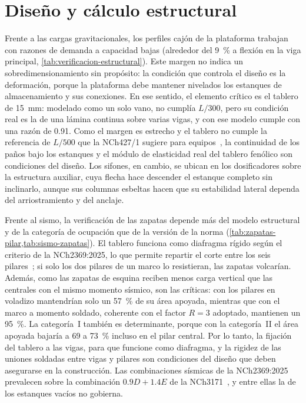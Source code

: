 \section{Diseño y cálculo estructural}
\label{sec:dis-estructural}

Frente a las cargas gravitacionales, los perfiles cajón de la plataforma trabajan con razones de demanda a capacidad bajas (alrededor del \qty{9}{\percent} a flexión en la viga principal, \cref{tab:verificacion-estructural}).
Este margen no indica un sobredimensionamiento sin propósito: la condición que controla el diseño es la deformación, porque la plataforma debe mantener nivelados los estanques de almacenamiento y sus conexiones.
En ese sentido, el elemento crítico es el tablero de \qty{15}{\milli\meter}: modelado como un solo vano, no cumplía $L/300$, pero su condición real es la de una lámina continua sobre varias vigas, y con ese modelo cumple con una razón de \num{0.91}.
Como el margen es estrecho y el tablero no cumple la referencia de $L/500$ que la NCh427/1 sugiere para equipos~\parencite{inn2016nch427}, la continuidad de los paños bajo los estanques y el módulo de elasticidad real del tablero fenólico son condiciones del diseño.
Los sifones, en cambio, se ubican en los dosificadores sobre la estructura auxiliar, cuya flecha hace descender el estanque completo sin inclinarlo, aunque sus columnas esbeltas hacen que su estabilidad lateral dependa del arriostramiento y del anclaje.

Frente al sismo, la verificación de las zapatas depende más del modelo estructural y de la categoría de ocupación que de la versión de la norma (\cref{tab:zapatas-pilar,tab:sismo-zapatas}).
El tablero funciona como diafragma rígido según el criterio de la NCh2369:2025, lo que permite repartir el corte entre los seis pilares~\parencite{inn2025nch2369}; si solo los dos pilares de un marco lo resistieran, las zapatas volcarían.
Además, como las zapatas de esquina reciben menos carga vertical que las centrales con el mismo momento sísmico, son las críticas: con los pilares en voladizo mantendrían solo un \qty{57}{\percent} de su área apoyada, mientras que con el marco a momento soldado, coherente con el factor $R = 3$ adoptado, mantienen un \qty{95}{\percent}.
La categoría~I también es determinante, porque con la categoría~II el área apoyada bajaría a 69 a \qty{73}{\percent} incluso en el pilar central.
Por lo tanto, la fijación del tablero a las vigas, para que funcione como diafragma, y la rigidez de las uniones soldadas entre vigas y pilares son condiciones del diseño que deben asegurarse en la construcción.
Las combinaciones sísmicas de la NCh2369:2025 prevalecen sobre la combinación $\num{0.9}D + \num{1.4}E$ de la NCh3171~\parencite{inn2017nch3171}, y entre ellas la de los estanques vacíos no gobierna.

